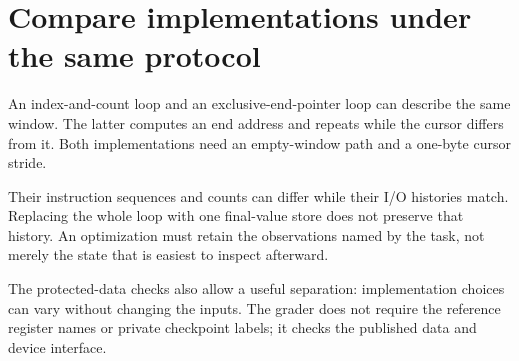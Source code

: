 \section{Compare implementations under the same
  protocol}\label{005-seven-segment-counter-p11-compare-implementations-under-the-same-protocol}

An index-and-count loop and an exclusive-end-pointer loop can describe
the same window. The latter computes an end address and repeats while
the cursor differs from it. Both implementations need an empty-window
path and a one-byte cursor stride.

Their instruction sequences and counts can differ while their I/O
histories match. Replacing the whole loop with one final-value store
does not preserve that history. An optimization must retain the
observations named by the task, not merely the state that is easiest to
inspect afterward.

The protected-data checks also allow a useful separation: implementation
choices can vary without changing the inputs. The grader does not
require the reference register names or private checkpoint labels; it
checks the published data and device interface.
